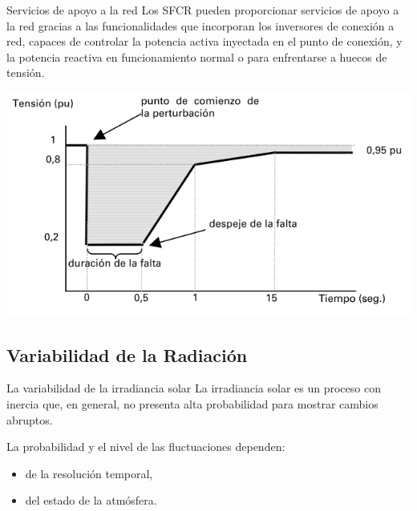 \documentclass[aspectratio=169, usenames,svgnames,dvipsnames]{beamer}
\begin{document}
\begin{frame}[label={sec:org2bc93dd}]{Servicios de apoyo a la red}
Los SFCR pueden proporcionar \alert{servicios de apoyo} a la red gracias a las
funcionalidades que incorporan los inversores de conexión a red,
capaces de \alert{controlar la potencia activa inyectada} en el punto de
conexión, \alert{y la potencia reactiva} en funcionamiento normal o para
enfrentarse a \alert{huecos de tensión}.

\begin{center}
\includegraphics[height=0.7\textheight]{../figs/hueco-tension.png}
\end{center}
\end{frame}

\subsection{Variabilidad de la Radiación}
\label{sec:org2f77527}

\begin{frame}[label={sec:org9ec9f37}]{La variabilidad de la irradiancia solar}
La irradiancia solar es un \alert{proceso con inercia} que, en general, no
presenta alta probabilidad para mostrar cambios abruptos.

La \alert{probabilidad y el nivel de las fluctuaciones dependen}:
\begin{itemize}
\item de la \alert{resolución temporal},
\item del \alert{estado de la atmósfera}.
\end{itemize}
\end{frame}
\end{document}
